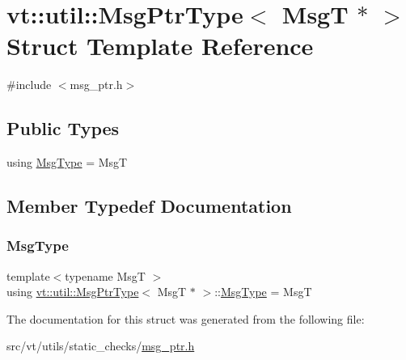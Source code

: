 \hypertarget{structvt_1_1util_1_1_msg_ptr_type_3_01_msg_t_01_5_01_4}{}\section{vt\+:\+:util\+:\+:Msg\+Ptr\+Type$<$ MsgT $\ast$ $>$ Struct Template Reference}
\label{structvt_1_1util_1_1_msg_ptr_type_3_01_msg_t_01_5_01_4}


{\ttfamily \#include $<$msg\+\_\+ptr.\+h$>$}

\subsection*{Public Types}
\begin{DoxyCompactItemize}
\item 
using \hyperlink{structvt_1_1util_1_1_msg_ptr_type_3_01_msg_t_01_5_01_4_a2ce38649dec10ad50b94963563fac9de}{Msg\+Type} = MsgT
\end{DoxyCompactItemize}


\subsection{Member Typedef Documentation}
\mbox{\label{structvt_1_1util_1_1_msg_ptr_type_3_01_msg_t_01_5_01_4_a2ce38649dec10ad50b94963563fac9de}} 
\subsubsection{\texorpdfstring{Msg\+Type}{MsgType}}
{\footnotesize\ttfamily template$<$typename MsgT $>$ \\
using \hyperlink{structvt_1_1util_1_1_msg_ptr_type}{vt\+::util\+::\+Msg\+Ptr\+Type}$<$ MsgT $\ast$ $>$\+::\hyperlink{structvt_1_1util_1_1_msg_ptr_type_3_01_msg_t_01_5_01_4_a2ce38649dec10ad50b94963563fac9de}{Msg\+Type} =  MsgT}



The documentation for this struct was generated from the following file\+:\begin{DoxyCompactItemize}
\item 
src/vt/utils/static\+\_\+checks/\hyperlink{msg__ptr_8h}{msg\+\_\+ptr.\+h}\end{DoxyCompactItemize}
